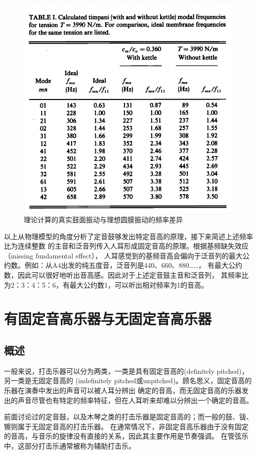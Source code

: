 \documentclass[a4paper]{ctexart}
\begin{document}
	\begin{figure}[htbp]
		\includegraphics[scale=0.4]{calculate_frequency.png}
		\centering
		\caption{理论计算的真实鼓面振动与理想圆膜振动的频率差异\cite{Christian1984Effects}}
		\label{calculate fre}
	\end{figure}
	\par 
	以上从物理模型的角度分析了定音鼓够发出特定音高的原理，接下来简述上述频率比为连续整数
	的主音和泛音列传入人耳形成固定音高的原理。根据基频缺失效应（missing fundamental effect），
	人耳感觉到的基频音高会偏向于泛音列的最大公约数。例如：从A4出发的纯五度音，泛音列是440、660、880……，
	有最大公约数，因此可以很好地听出音高感。因此对于上述定音鼓主音和泛音列，
	其频率比为2：3：4：5：6，有最大公约数1，可以听出相对频率为1的音高。
	\section{有固定音高乐器与无固定音高乐器}
	\subsection{概述}
	\par 
	一般来说，打击乐器可以分为两类，一类是具有固定音高的(definitely pitched)，另一类是无固定音高的
	(indefinitely pitched或unpitched)。顾名思义，固定音高的乐器在演奏中发出的声音可以被人耳分辨出
	确定的音高，而无固定音高的乐器发出的声音尽管也有特定的频率特征，但在人耳听来却难以分辨出一个确定的音高。
	\par 
	前面讨论过的定音鼓，以及木琴之类的打击乐器是固定音高的；而一般的鼓、钹、镲则属于无固定音高的打击乐器。
	在通常情况下，非固定音高乐器由于没有固定的音高，与音乐的旋律没有直接的关系，因此其主要作用是节奏强调。
	在管弦乐中，这部分打击乐通常被称为辅助打击乐。
\end{document}
